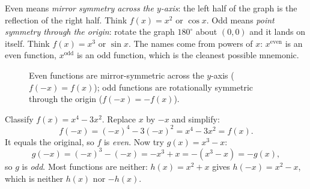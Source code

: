 Even means \emph{mirror symmetry across the $y$-axis}: the left half of the graph
is the reflection of the right half. Think $f(x)=x^2$ or $\cos x$. Odd means
\emph{point symmetry through the origin}: rotate the graph $180^\circ$ about
$(0,0)$ and it lands on itself. Think $f(x)=x^3$ or $\sin x$. The names come from
powers of $x$: $x^{\text{even}}$ is an even function, $x^{\text{odd}}$ is an odd
function, which is the cleanest possible mnemonic.

\begin{figure}[H]
\centering
{}
\hfill
{}
\caption{Even functions are mirror-symmetric across the $y$-axis ($f(-x)=f(x)$);
odd functions are rotationally symmetric through the origin ($f(-x)=-f(x)$).}
\label{ch02:fig-even-odd}
\end{figure}

\begin{example}
\label{ch02:ex-symmetry}
Classify $f(x) = x^4 - 3x^2$. Replace $x$ by $-x$ and simplify:
\[
  f(-x) = (-x)^4 - 3(-x)^2 = x^4 - 3x^2 = f(x).
\]
It equals the original, so $f$ is \emph{even}. Now try $g(x) = x^3 - x$:
\[
  g(-x) = (-x)^3 - (-x) = -x^3 + x = -(x^3 - x) = -g(x),
\]
so $g$ is \emph{odd}. Most functions are neither: $h(x) = x^2 + x$ gives
$h(-x) = x^2 - x$, which is neither $h(x)$ nor $-h(x)$.
\end{example}


